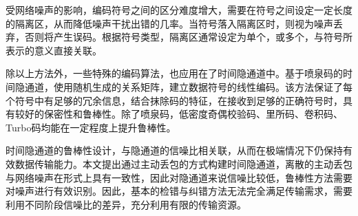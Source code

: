 受网络噪声的影响，编码符号之间的区分难度增大，需要在符号之间设定一定长度的隔离区，从而降低噪声干扰出错的几率。当符号落入隔离区时，则视为噪声丢弃，否则将产生误码。根据符号类型，隔离区通常设定为单个，或多个，与符号所表示的意义直接关联。

除以上方法外，一些特殊的编码算法，也应用在了时间隐通道中。基于喷泉码的时间隐通道，使用随机生成的关系矩阵，建立数据符号的线性编码。该方法保证了每个符号中有足够的冗余信息，结合抹除码的特征，在接收到足够的正确符号时，具有较好的保密性和鲁棒性。除了喷泉码，低密度奇偶校验码、里所码、卷积码、Turbo码均能在一定程度上提升鲁棒性。

时间隐通道的鲁棒性设计，与隐通道的信噪比相关联，从而在极端情况下仍保持有效数据传输能力。本文提出通过主动丢包的方式构建时间隐通道，离散的主动丢包与网络噪声在形式上具有一致性，因此对隐通道来说信噪比较低，鲁棒性方法需要对噪声进行有效识别。因此，基本的检错与纠错方法无法完全满足传输需求，需要利用不同阶段信噪比的差异，充分利用有限的传输资源。